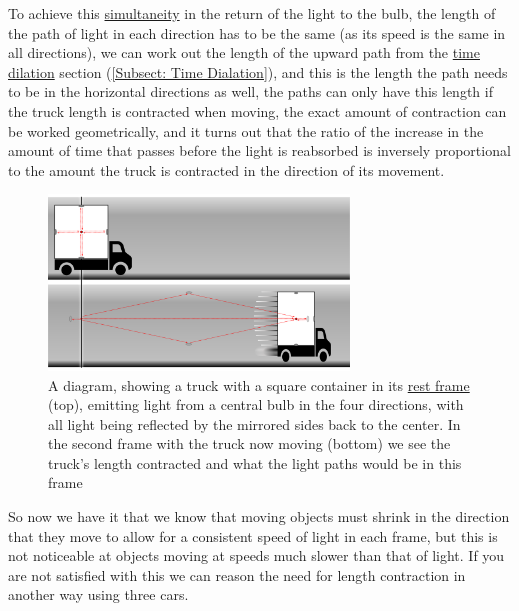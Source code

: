 To achieve this \hyperlink{def-simultaneity}{simultaneity} in the return of the light to the bulb, the length of the path of light in each direction has to be the same (as its speed is the same in all directions), we can work out the length of the upward path from the \hyperlink{def-time-dilation}{time dilation} section (\ref{Subsect: Time Dialation}), and this is the length the path needs to be in the horizontal directions as well, the paths can only have this length if the truck length is contracted when moving, the exact amount of contraction can be worked geometrically, and it turns out that the ratio of the increase in the amount of time that passes before the light is reabsorbed is inversely proportional to the amount the truck is contracted in the direction of its movement.

\begin{figure}[H]
	\centering
	\includegraphics[width=8cm]{images/pdf/Full_Lorry_Transform.pdf}
	\caption{A diagram, showing a truck with a square container in its \protect\hyperlink{def-proper-frame}{rest frame} (top), emitting light from a central bulb in the four directions, with all light being reflected by the mirrored sides back to the center. In the second frame with the truck now moving (bottom) we see the truck's length contracted and what the light paths would be in this frame}
	\label{fig: full truck transform}
\end{figure}

So now we have it that we know that moving objects must shrink in the direction that they move to allow for a consistent speed of light in each frame, but this is not noticeable at objects moving at speeds much slower than that of light. If you are not satisfied with this we can reason the need for length contraction in another way using three cars.


